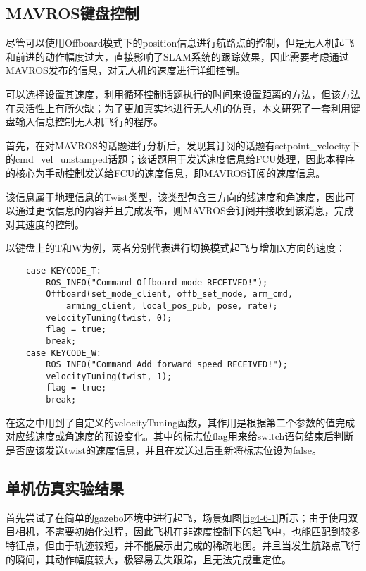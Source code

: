 \subsection{MAVROS键盘控制} \label{4.2.4}

尽管可以使用Offboard模式下的position信息进行航路点的控制，但是无人机起飞和前进的动作幅度过大，直接影响了SLAM系统的跟踪效果，因此需要考虑通过MAVROS发布的信息，对无人机的速度进行详细控制。

可以选择设置其速度，利用循环控制话题执行的时间来设置距离的方法，但该方法在灵活性上有所欠缺；为了更加真实地进行无人机的仿真，本文研究了一套利用键盘输入信息控制无人机飞行的程序。

首先，在对MAVROS的话题进行分析后，发现其订阅的话题有setpoint\_velocity下的cmd\_vel\_unstamped话题；该话题用于发送速度信息给FCU处理，因此本程序的核心为手动控制发送给FCU的速度信息，即MAVROS订阅的速度信息。

该信息属于地理信息的Twist类型，该类型包含三方向的线速度和角速度，因此可以通过更改信息的内容并且完成发布，则MAVROS会订阅并接收到该消息，完成对其速度的控制。

以键盘上的T和W为例，两者分别代表进行切换模式起飞与增加X方向的速度：

\begin{verbatim}
    case KEYCODE_T:
        ROS_INFO("Command Offboard mode RECEIVED!");
        Offboard(set_mode_client, offb_set_mode, arm_cmd,
            arming_client, local_pos_pub, pose, rate);
        velocityTuning(twist, 0);
        flag = true;
        break;
    case KEYCODE_W:
        ROS_INFO("Command Add forward speed RECEIVED!");
        velocityTuning(twist, 1);
        flag = true;
        break;
\end{verbatim}

在这之中用到了自定义的velocityTuning函数，其作用是根据第二个参数的值完成对应线速度或角速度的预设变化。其中的标志位flag用来给switch语句结束后判断是否应该发送twist的速度信息，并且在发送过后重新将标志位设为false。

\subsection{单机仿真实验结果} \label{4.2.5}

首先尝试了在简单的gazebo环境中进行起飞，场景如图\ref{fig4-6-1}所示；由于使用双目相机，不需要初始化过程，因此飞机在非速度控制下的起飞中，也能匹配到较多特征点，但由于轨迹较短，并不能展示出完成的稀疏地图。并且当发生航路点飞行的瞬间，其动作幅度较大，极容易丢失跟踪，且无法完成重定位。

